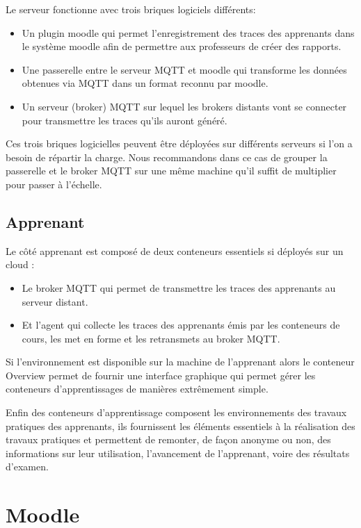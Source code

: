 \documentclass[a4paper,11pt]{report}
\begin{document}
Le serveur fonctionne avec trois briques logiciels différents:

\begin{itemize}
  \item Un plugin moodle qui permet l'enregistrement des traces des apprenants dans le système moodle afin de permettre aux professeurs de créer des rapports.
  \item Une passerelle entre le serveur MQTT et moodle qui transforme les données obtenues via MQTT dans un format reconnu par moodle.
  \item Un serveur (broker) MQTT sur lequel les brokers distants vont se connecter pour transmettre les traces qu'ils auront généré.
\end{itemize}

Ces trois briques logicielles peuvent être déployées sur différents serveurs si l'on a besoin de répartir la charge. Nous recommandons dans ce cas de grouper la passerelle et le broker MQTT sur une même machine qu'il suffit de multiplier pour passer à l'échelle.

\subsection{Apprenant}

Le côté apprenant est composé de deux conteneurs essentiels si déployés sur un cloud :

\begin{itemize}
  \item Le broker MQTT qui permet de transmettre les traces des apprenants au serveur distant.
  \item Et l'agent qui collecte les traces des apprenants émis par les conteneurs de cours, les met en forme et les retransmets au broker MQTT.
\end{itemize}

Si l'environnement est disponible sur la machine de l'apprenant alors le conteneur Overview permet de fournir une interface graphique qui permet gérer les conteneurs d'apprentissages de manières extrêmement simple.

Enfin des conteneurs d'apprentissage composent les environnements des travaux pratiques des apprenants, ils fournissent les éléments essentiels à la réalisation des travaux pratiques et permettent de remonter, de façon anonyme ou non, des informations sur leur utilisation, l'avancement de l'apprenant, voire des résultats d'examen.

\section{Moodle}
\end{document}
